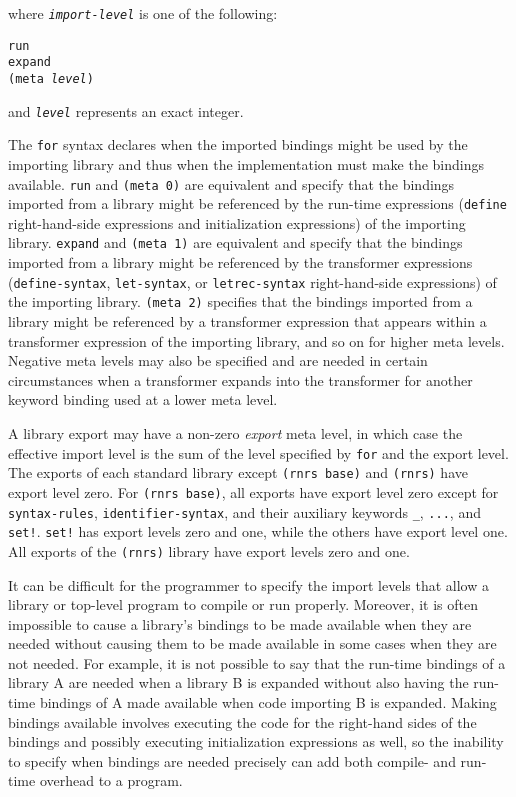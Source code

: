where \texttt{\textit{import-level}} is one of the following:


\begin{alltt}
run
expand
(meta \textit{level})
\end{alltt}


and \texttt{\textit{level}} represents an exact integer.


\label{libraries_s6}The \texttt{for} syntax declares when the imported bindings might be
used by the importing library and thus when the implementation must make
the bindings available.
\texttt{run} and \texttt{(meta 0)} are equivalent and specify that the
bindings imported from a library might be referenced by the run-time
expressions (\texttt{define} right-hand-side expressions and initialization
expressions) of the importing library.
\texttt{expand} and \texttt{(meta 1)} are equivalent and specify that the
bindings imported from a library might be referenced by the transformer
expressions (\texttt{define-syntax}, \texttt{let-syntax}, or
\texttt{letrec-syntax} right-hand-side expressions) of the importing
library.
\texttt{(meta 2)} specifies that the bindings imported from
a library might be referenced by a transformer expression that
appears within a transformer expression of the importing library,
and so on for higher meta levels.
Negative meta levels may also be specified and are needed in certain
circumstances when a transformer expands into the transformer for another
keyword binding used at a lower meta level.


\label{libraries_s7}\label{libraries_export_level}A library export may have a non-zero \textit{export} meta level, in which
case the effective import level is the sum of the level specified by
\texttt{for} and the export level.
The exports of each standard library except \texttt{(rnrs base)}
and \texttt{(rnrs)} have export level zero.
For \texttt{(rnrs base)}, all exports have export level zero except
for \texttt{syntax-rules}, \texttt{identifier-syntax}, and their
auxiliary keywords \texttt{\_{}}, \texttt{...}, and \texttt{set!}.
\texttt{set!} has export levels zero and one, while the others have
export level one.
All exports of the \texttt{(rnrs)} library have export levels zero and
one.


It can be difficult for the programmer to specify the import levels that
allow a library or top-level program to compile or run properly.
Moreover, it is often impossible to cause a library's bindings to be made
available when they are needed without causing them to be made available in
some cases when they are not needed.
For example, it is not possible to say that the run-time bindings of a
library A are needed when a library B is expanded without also having the
run-time bindings of A made available when code importing B is expanded.
Making bindings available involves executing the code for the right-hand
sides of the bindings and possibly executing initialization expressions as
well, so the inability to specify when bindings are needed precisely can
add both compile- and run-time overhead to a program.


